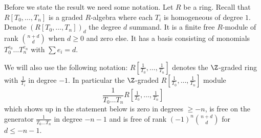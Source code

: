 Before we state the result we need some notation. Let $R$ be a ring. Recall that $R[T_0,\ldots,T_n]$ is a graded $R$-algebra where each $T_i$ is homogeneous of degree $1$. Denote $(R[T_0,\ldots,T_n])_d$ the degree $d$ summand. It is a finite free $R$-module of rank $\binom{n+d}{d}$ when $d\geq0$ and zero else. It has a basis consisting of monomials $T_0^{e_0}\ldots T_n^{e_n}$ with $\sum e_i=d$.

We will also use the following notation: $R[\frac1{T_0},\ldots,\frac1{T_n}]$ denotes the $\Z$-graded ring with $\frac1{T_i}$ in degree $-1$. In particular the $\Z$-graded $R[\frac1{T_0},\ldots,\frac1{T_n}]$ module
\[
\frac1{T_0\ldots T_n}R[\tfrac1{T_0},\ldots,\tfrac1{T_n}]
\]
which shows up in the statement below is zero in degrees $\geq-n$, is free on the generator $\frac1{T_0\ldots T_n}$ in degree $-n-1$ and is free of rank $(-1)^n\binom{n+d}{d}$ for $d\leq-n-1$.

